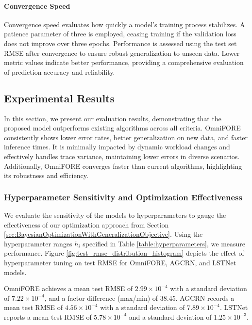 \documentclass{ieeetmlcn}
\begin{document}
\paragraph*{Convergence Speed}
Convergence speed evaluates how quickly a model's training process stabilizes. A patience parameter of three is employed, ceasing training if the validation loss does not improve over three epochs. Performance is assessed using the test set RMSE after convergence to ensure robust generalization to unseen data. Lower metric values indicate better performance, providing a comprehensive evaluation of prediction accuracy and reliability.

\subsection{Experimental Results}
\label{sec: Experimental Results}

In this section, we present our evaluation results, demonstrating that the proposed model outperforms existing algorithms across all criteria. OmniFORE consistently shows lower error rates, better generalization on new data, and faster inference times. It is minimally impacted by dynamic workload changes and effectively handles trace variance, maintaining lower errors in diverse scenarios. Additionally, OmniFORE converges faster than current algorithms, highlighting its robustness and efficiency.

\subsubsection{\textbf{Hyperparameter Sensitivity and Optimization Effectiveness}}

We evaluate the sensitivity of the models to hyperparameters to gauge the effectiveness of our optimization approach from Section \ref{sec:BayesianOptimizationWithGeneralizationObjective}. Using the hyperparameter ranges $h_i$ specified in Table \ref{table:hyperparameters}, we measure performance. Figure \ref{fig:test_rmse_distribution_histogram} depicts the effect of hyperparameter tuning on test RMSE for OmniFORE, AGCRN, and LSTNet models.

OmniFORE achieves a mean test RMSE of $2.99 \times 10^{-4}$ with a standard deviation of $7.22 \times 10^{-4}$, and a factor difference (max/min) of 38.45. AGCRN records a mean test RMSE of $4.56 \times 10^{-4}$ with a standard deviation of $7.89 \times 10^{-4}$. LSTNet reports a mean test RMSE of $5.78 \times 10^{-4}$ and a standard deviation of $1.25 \times 10^{-3}$.
\end{document}

